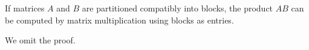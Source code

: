 \documentclass{ximera}
\begin{document}
\begin{theorem}\label{th:blockmatmult}
If matrices $A$ and $B$ are partitioned compatibly into blocks, the product $AB$ can be computed by matrix multiplication using blocks as entries.
\end{theorem}
We omit the proof.

\end{document}
